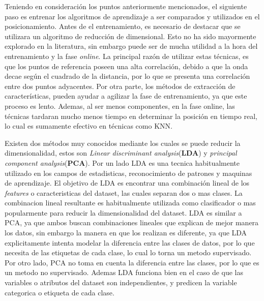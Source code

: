 Teniendo en consideración los puntos anteriormente mencionados, el siguiente paso es entrenar los algoritmos de aprendizaje a ser comparados y utilizados en el posicionamiento. Antes de el entrenamiento, es necesario de destacar que se utilizara un algoritmo de reducción de dimensional. Esto no ha sido mayormente explorado en la literatura, sin embargo puede ser de mucha utilidad a la hora del entrenamiento y la fase \textit{online}. La principal razón de utilizar estas técnicas, es que los puntos de referencia poseen una alta correlación, debido a que la onda decae según el cuadrado de la distancia, por lo que se presenta una correlación entre dos puntos adyacentes. Por otra parte, los métodos de extracción de características, pueden ayudar a agilizar la fase de entrenamiento, ya que este proceso es lento. Ademas, al ser menos componentes, en la fase online, las técnicas tardaran mucho menos tiempo en determinar la posición en tiempo real, lo cual es sumamente efectivo en técnicas como KNN.

Existen dos métodos muy conocidos mediante los cuales se puede reducir la dimensionalidad, estos son \textit{Linear discriminant analysis}(\textbf{LDA}) y \textit{principal component analysis}(\textbf{PCA}). Por un lado LDA es una tecnica habitualmente utilizado en los campos de estadisticas, reconocimiento de patrones y maquinas de aprendizaje. El objetivo de LDA es encontrar una combinación lineal de los \textit{features} o caracteristicas del dataset, las cuales separan dos o mas clases. La combinacion lineal resultante es habitualmente utilizada como clasificador o mas popularmente para reducir la dimensionalidad del dataset. LDA es similar a PCA, ya que ambos buscan combinaciones lineales que explican de mejor manera los datos, sin embargo la manera en que los realizan es diferente, ya que LDA explicitamente intenta modelar la diferencia entre las clases de datos, por lo que necesita de las etiquetas de cada clase, lo cual lo torna un metodo supervisado. Por otro lado, PCA no toma en cuenta la diferencia entre las clases, por lo que es un metodo no supervisado. Ademas LDA funciona bien en el caso de que las variables o atributos del dataset son independientes, y predicen la variable categorica o etiqueta de cada clase.

